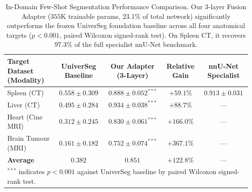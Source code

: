 
\begin{table}[t]
\centering
\caption{In-Domain Few-Shot Segmentation Performance Comparison. Our 3-layer Fusion Adapter ($355\text{K}$ trainable params, 23.1\% of total network) significantly outperforms the frozen UniverSeg foundation baseline across all four anatomical targets ($p < 0.001$, paired Wilcoxon signed-rank test). On Spleen CT, it recovers $97.3\%$ of the full specialist nnU-Net benchmark.}
\label{tab:main_results}
\begin{tabular}{l|c|c|c|c}
\hline
\textbf{Target Dataset (Modality)} & \textbf{UniverSeg Baseline} & \textbf{Our Adapter (3-Layer)} & \textbf{Relative Gain} & \textbf{nnU-Net Specialist} \\
\hline
Spleen (CT)           & $0.558 \pm 0.309$ & $\mathbf{0.888 \pm 0.052}^{***}$ & $+59.1\%$  & $0.913 \pm 0.031$ \\
Liver (CT)            & $0.495 \pm 0.284$ & $\mathbf{0.934 \pm 0.038}^{***}$ & $+88.7\%$  & --- \\
Heart (Cine MRI)      & $0.312 \pm 0.245$ & $\mathbf{0.830 \pm 0.061}^{***}$ & $+166.0\%$ & --- \\
Brain Tumour (MRI)    & $0.161 \pm 0.182$ & $\mathbf{0.752 \pm 0.074}^{***}$ & $\mathbf{+367.1\%}$ & --- \\
\hline
\textbf{Average}      & $0.382$           & $\mathbf{0.851}$                 & $+122.8\%$ & --- \\
\hline
\multicolumn{5}{l}{\footnotesize $^{***}$ indicates $p < 0.001$ against UniverSeg baseline by paired Wilcoxon signed-rank test.}
\end{tabular}
\end{table}



